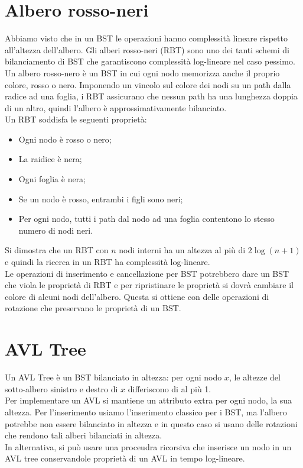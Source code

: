 \documentclass[12pt]{report}
\begin{document}
   	\section{Albero rosso-neri}
   	Abbiamo visto che in un BST le operazioni hanno complessità lineare rispetto all'altezza dell'albero. Gli alberi rosso-neri (RBT) sono uno dei tanti schemi di bilanciamento di BST che garantiscono complessità log-lineare nel caso pessimo. Un albero rosso-nero è un BST in cui ogni nodo memorizza anche il proprio colore, rosso o nero. Imponendo un vincolo sul colore dei nodi su un path dalla radice ad una foglia, i RBT assicurano che nessun path ha una lunghezza doppia di un altro, quindi l'albero è approssimativamente bilanciato. \\
   	Un RBT soddisfa le seguenti proprietà:
   	\begin{itemize}
   		\item Ogni nodo è rosso o nero;
   		\item La raidice è nera;
   		\item Ogni foglia è nera;
   		\item Se un nodo è rosso, entrambi i figli sono neri;
   		\item Per ogni nodo, tutti i path dal nodo ad una foglia contentono lo stesso numero di nodi neri.
   	\end{itemize}
   	Si dimostra che un RBT con $n$ nodi interni ha un altezza al più di $2\log(n + 1)$ e quindi la ricerca in un RBT ha complessità log-lineare. \\
   	Le operazioni di inserimento e cancellazione per BST potrebbero dare un BST che viola le proprietà di RBT e per ripristinare le proprietà si dovrà cambiare il colore di alcuni nodi dell'albero. Questa si ottiene con delle operazioni di rotazione che preservano le proprietà di un BST.
   	\section{AVL Tree}
   	Un AVL Tree è un BST bilanciato in altezza: per ogni nodo $x$, le altezze del sotto-albero sinistro e destro di $x$ differiscono di al più 1. \\
   	Per implementare un AVL si mantiene un attributo extra per ogni nodo, la sua altezza. Per l'inserimento usiamo l'inserimento classico per i BST, ma l'albero potrebbe non essere bilanciato in altezza e in questo caso si usano delle rotazioni che rendono tali alberi bilanciati in altezza. \\
   	In alternativa, si può usare una proceudra ricorsiva che inserisce un nodo in un AVL tree conservandole proprietà di un AVL in tempo log-lineare.
\end{document}
